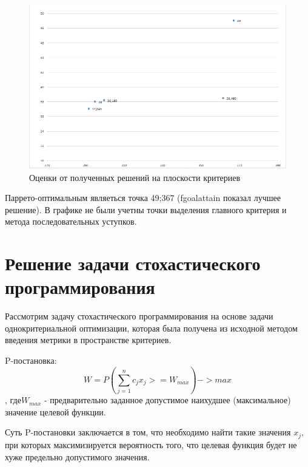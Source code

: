 \documentclass[14pt,a4paper,report]{report}
\begin{document}
\begin{figure}[h!]
	\includegraphics[width=\textwidth]{img/1.png}
	\caption{Оценки от полученных решений на плоскости критериев}
\end{figure}  


Паррето-оптимальным являеться точка 49;367 (fgoalattain показал лучшее решение). В графике не были учетны точки выделения главного критерия и метода последовательных уступков.


























\section{Решение задачи стохастического программирования}
Рассмотрим задачу стохастического программирования на основе задачи однокритериальной оптимизации, которая была получена из исходной методом введения метрики в пространстве критериев.

P-постановка:
$$  W =P(\sum_{j=1}^{n} c_j x_j >=W_{max})->max $$
, где$ W_{max}$ - предварительно заданное допустимое наихудшее (максимальное) значение целевой функции.

Суть P-постановки заключается в том, что необходимо найти такие значения $x_j$, при которых максимизируется вероятность того, что целевая функция будет не хуже предельно допустимого значения.
\end{document}
